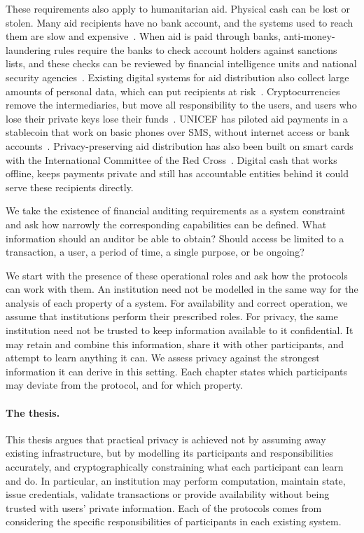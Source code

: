 These requirements also apply to humanitarian aid. Physical cash can be lost or stolen. Many aid
recipients have no bank account, and the systems used to reach them are slow
and expensive~\cite{unicef2026aidlink}. When aid is paid through banks,
anti-money-laundering rules require the banks to check account holders against
sanctions lists, and these checks can be reviewed by financial intelligence
units and national security agencies~\cite{hayes2017migration}. Existing
digital systems for aid distribution also collect large amounts of personal
data, which can put recipients at risk~\cite{SP:WLSNT23}. Cryptocurrencies
remove the intermediaries, but move all responsibility to the users, and users
who lose their private keys lose their funds~\cite{eskandari2015bitcoin}.
UNICEF has piloted aid payments in a stablecoin that work on basic phones over
SMS, without internet access or bank accounts~\cite{unicef2026aidlink}.
Privacy-preserving aid distribution has also been built on smart cards with the
International Committee of the Red Cross~\cite{SP:WLSNT23,SP:LCSNTL25}.
Digital cash that works offline, keeps payments private and still has
accountable entities behind it could serve these recipients directly.

We take the existence of financial auditing requirements as a system constraint
and ask how narrowly the corresponding capabilities can be defined.  What
information should an auditor be able to obtain? Should access be limited to a
transaction, a user, a period of time, a single purpose, or be ongoing?

We start with the presence of these operational roles and ask how the protocols
can work with them. An institution need not be modelled in the same way for the
analysis of each property of a system. For availability and correct operation,
we assume that institutions perform their prescribed roles. For privacy, the
same institution need not be trusted to keep information available to it
confidential. It may retain and combine this information, share it with other
participants, and attempt to learn anything it can. We assess privacy against
the strongest information it can derive in this setting. Each chapter states
which participants may deviate from the protocol, and for which property.

\paragraph{The thesis.} This thesis argues that practical privacy is achieved
not by assuming away existing infrastructure, but by modelling its participants
and responsibilities accurately, and cryptographically constraining what each
participant can learn and do. In particular, an institution may perform
computation, maintain state, issue credentials, validate transactions or
provide availability without being trusted with users' private information.
Each of the protocols comes from considering the specific responsibilities of
participants in each existing system.

